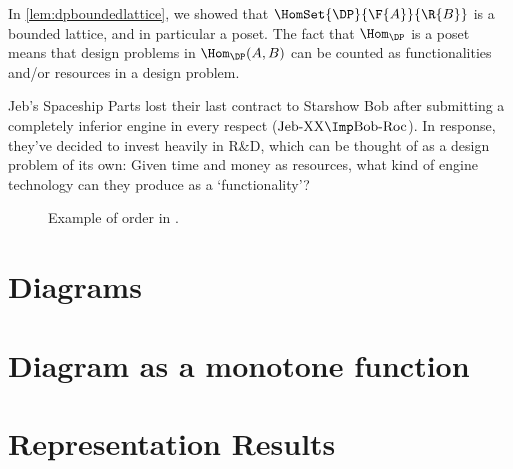

\begin{remark}
  In \cref{lem:dpboundedlattice}, we showed that $\HomSet{\DP}{\F{A}}{\R{B}}$ is a bounded lattice, and in particular a poset. The fact that $\Hom_\DP$ is a poset means that design problems in $\Hom_\DP(A,B)$ can be counted as functionalities and/or resources in a design problem.
\end{remark}

\begin{example}
  \label{ex:rd}
  Jeb's Spaceship Parts lost their last contract to Starshow Bob after submitting a completely inferior engine in every respect ($\text{Jeb-XX} \Imp \text{Bob-Roc}$). In response, they've decided to invest heavily in R\&D, which can be thought of as a design problem of its own: Given time and money as resources, what kind of engine technology can they produce as a `functionality'?
\end{example}

\begin{figure}[h!]
  \begin{center}
  \end{center}
  \caption{Example of order in \DP. \label{fig:orderdp}}
\end{figure}


\section{Diagrams}\label{sec:higher-diagrams}


\section{Diagram as a monotone function}\label{sec:higher-diagram-as-function}


\section{Representation Results}\label{sec:higher-representation}

